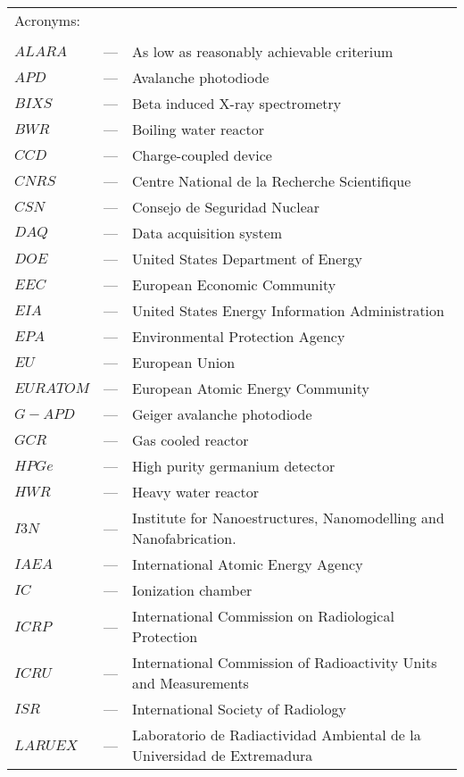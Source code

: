 \begin{longtable}{p{25mm} c p{120mm} }
\multicolumn{3}{l}{Acronyms:}\\
\\
$ALARA$ & --- & As low as reasonably achievable criterium\\
$APD$ & --- & Avalanche photodiode\\
$BIXS$ & --- & Beta induced X-ray spectrometry\\
$BWR$ & --- & Boiling water reactor\\
$CCD$ & --- & Charge-coupled device\\
$CNRS$ & --- & Centre National de la Recherche Scientifique\\
$CSN$ & --- & Consejo de Seguridad Nuclear\\
$DAQ$ & --- & Data acquisition system\\
$DOE$ & --- & United States Department of Energy\\
$EEC$ & --- & European Economic Community\\
$EIA$ & --- & United States Energy Information Administration\\
$EPA$ & --- & Environmental Protection Agency\\
$EU$ & --- & European Union\\
$EURATOM$ & --- & European Atomic Energy Community\\
$G-APD$ & --- & Geiger avalanche photodiode\\
$GCR$ & --- & Gas cooled reactor\\
$HPGe$ & --- & High purity germanium detector\\
$HWR$ & --- & Heavy water reactor\\
$I3N$ & --- & Institute for Nanoestructures, Nanomodelling and
\newline
Nanofabrication.\\
$IAEA$ & --- & International Atomic Energy Agency \\
$IC$ & --- & Ionization chamber\\
$ICRP$ & --- & International Commission on Radiological Protection \\
$ICRU$ & --- & International Commission of Radioactivity Units 
\newline
and Measurements\\
$ISR$ & --- & International Society of Radiology \\
$LARUEX$ & --- & Laboratorio de Radiactividad Ambiental de la
\newline
Universidad de Extremadura\\

\end{longtable}
